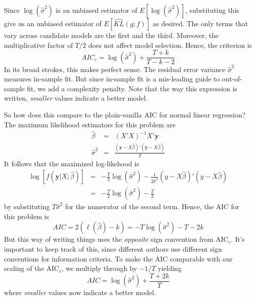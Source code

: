 \documentclass[12pt]{article}
\theoremstyle{definition}
\begin{document}
Since $\log(\widehat{\sigma}^2)$ is an unbiased estimator of $E[\log(\widehat{\sigma}^2)]$, substituting this give us an unbiased estimator of $E\left[\widehat{KL}(g;f) \right]$ as desired.
The only terms that vary across candidate models are the first and the third. Moreover, the multiplicative factor of $T/2$ does not affect model selection. Hence, the criterion is
$$AIC_c = \log(\widehat{\sigma}^2) + \frac{T + k}{T - k -2}$$
In its broad strokes, this makes perfect sense. The residual error variance $\widehat{\sigma}^2$ measures in-sample fit. But since in-sample fit is a mis-leading guide to out-of-sample fit, we add a complexity penalty. Note that the way this expression is written, \emph{smaller} values indicate a better model. 

So how does this compare to the plain-vanilla AIC for normal linear regression? The maximum likelihood estimators for this problem are
\begin{eqnarray*}
\widehat{\beta} &=& (X'X)^{-1}X'\mathbf{y}\\
\widehat{\sigma}^2 &=& \frac{(\mathbf{y} - X\widehat{\beta})'(\mathbf{y} - X\widehat{\beta})}{T}
\end{eqnarray*}
It follows that the maximized log-likehood is
\begin{eqnarray*}
\log\left[f(\mathbf{y}|X;\widehat{\beta})\right] &=& -\frac{T}{2} \log(\widehat{\sigma}^2) - \frac{1}{2\widehat{\sigma}^2}(y - X\widehat{\beta})'(y -X\widehat{\beta})\\
&=& -\frac{T}{2} \log(\widehat{\sigma}^2) - \frac{T}{2}
\end{eqnarray*}
by substituting $T\widehat{\sigma}^2$ for the numerator of the second term. Hence, the AIC for this problem is
$$AIC = 2\left(\ell(\widehat{\beta}) - k \right) = -T\log(\widehat{\sigma}^2) - T - 2k $$
But this way of writing things uses the \emph{opposite} sign convention from AIC$_c$. It's important to keep track of this, since different authors use different sign conventions for information criteria. To make the AIC comparable with our scaling of the AIC$_c$, we multiply through by $-1/T$ yielding
$$AIC = \log(\widehat{\sigma}^2) + \frac{T + 2k}{T}$$
where \emph{smaller} values now indicate a better model.
\end{document}
